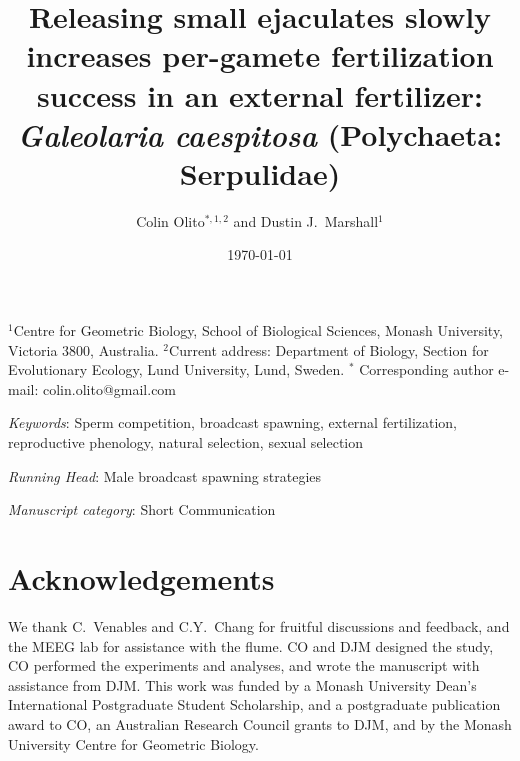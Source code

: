 \documentclass{article}
\title{Releasing small ejaculates slowly increases per-gamete fertilization success in an external fertilizer: \textit{Galeolaria caespitosa} (Polychaeta: Serpulidae)}
\author{Colin Olito$^{\ast,1,2}$ and Dustin J.~Marshall$^{1}$}
\date{\today}
\begin{document}
\maketitle


\noindent{} $^1$Centre for Geometric Biology, School of Biological Sciences, Monash University, Victoria 3800, Australia.
\noindent{} $^2$Current address: Department of Biology, Section for Evolutionary Ecology, Lund University, Lund, Sweden.
\noindent{} $^\ast$ Corresponding author e-mail: colin.olito@gmail.com

\bigskip

\noindent{} \textit{Keywords}: Sperm competition, broadcast spawning, external fertilization, reproductive phenology, natural selection, sexual selection
\bigskip

\noindent{} \textit{Running Head}: Male broadcast spawning strategies

\bigskip

\noindent{} \textit{Manuscript category}: Short Communication

\bigskip

\section{Acknowledgements}
We thank C.~Venables and C.Y.~Chang for fruitful discussions and feedback, and the MEEG lab for assistance with the flume. CO and DJM designed the study, CO performed the experiments and analyses, and wrote the manuscript with assistance from DJM. This work was funded by a Monash University Dean's International Postgraduate Student Scholarship, and a postgraduate publication award to CO, an Australian Research Council grants to DJM, and by the Monash University Centre for Geometric Biology. 
\end{document}
